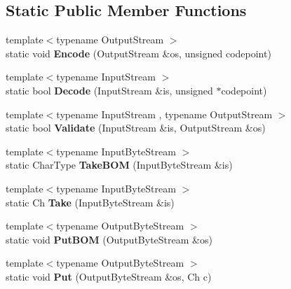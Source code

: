 \subsection*{Static Public Member Functions}
\begin{DoxyCompactItemize}
\item 
{\footnotesize template$<$typename Output\+Stream $>$ }\\static void {\bfseries Encode} (Output\+Stream \&os, unsigned codepoint)\hypertarget{struct_a_s_c_i_i_af56b1605fe233c54693facc7de457f72}{}\label{struct_a_s_c_i_i_af56b1605fe233c54693facc7de457f72}

\item 
{\footnotesize template$<$typename Input\+Stream $>$ }\\static bool {\bfseries Decode} (Input\+Stream \&is, unsigned $\ast$codepoint)\hypertarget{struct_a_s_c_i_i_a44844bbfd0a4fc282993fd72f3f58eee}{}\label{struct_a_s_c_i_i_a44844bbfd0a4fc282993fd72f3f58eee}

\item 
{\footnotesize template$<$typename Input\+Stream , typename Output\+Stream $>$ }\\static bool {\bfseries Validate} (Input\+Stream \&is, Output\+Stream \&os)\hypertarget{struct_a_s_c_i_i_a398680588a09e6ce9b56e32195047c78}{}\label{struct_a_s_c_i_i_a398680588a09e6ce9b56e32195047c78}

\item 
{\footnotesize template$<$typename Input\+Byte\+Stream $>$ }\\static Char\+Type {\bfseries Take\+B\+OM} (Input\+Byte\+Stream \&is)\hypertarget{struct_a_s_c_i_i_aad78500eb98f45582a4df020e3fb2278}{}\label{struct_a_s_c_i_i_aad78500eb98f45582a4df020e3fb2278}

\item 
{\footnotesize template$<$typename Input\+Byte\+Stream $>$ }\\static Ch {\bfseries Take} (Input\+Byte\+Stream \&is)\hypertarget{struct_a_s_c_i_i_ab1b9fdf0a5c05658d62fded913d923a3}{}\label{struct_a_s_c_i_i_ab1b9fdf0a5c05658d62fded913d923a3}

\item 
{\footnotesize template$<$typename Output\+Byte\+Stream $>$ }\\static void {\bfseries Put\+B\+OM} (Output\+Byte\+Stream \&os)\hypertarget{struct_a_s_c_i_i_a3036dc1d604039c3224ca0a890ee0134}{}\label{struct_a_s_c_i_i_a3036dc1d604039c3224ca0a890ee0134}

\item 
{\footnotesize template$<$typename Output\+Byte\+Stream $>$ }\\static void {\bfseries Put} (Output\+Byte\+Stream \&os, Ch c)\hypertarget{struct_a_s_c_i_i_a218b244b9cd961ea6c5775a734cec20e}{}\label{struct_a_s_c_i_i_a218b244b9cd961ea6c5775a734cec20e}

\end{DoxyCompactItemize}


